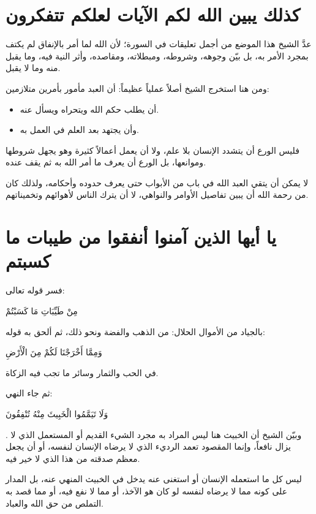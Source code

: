 \separator

\section{كذلك يبين الله لكم الآيات لعلكم تتفكرون}
عدَّ الشيخ هذا الموضع من أجمل تعليقات  في السورة؛ لأن الله لما أمر بالإنفاق لم يكتف بمجرد الأمر به، بل بيّن وجوهه، وشروطه، ومبطلاته، ومقاصده، وأثر النية فيه، وما يقبل منه وما لا يقبل.

ومن هنا استخرج الشيخ أصلاً عملياً عظيماً: أن العبد مأمور بأمرين متلازمين:
\begin{itemize}
    \item أن يطلب حكم الله ويتحراه ويسأل عنه.
    \item وأن يجتهد بعد العلم في العمل به.
\end{itemize}

فليس الورع أن يتشدد الإنسان بلا علم، ولا أن يعمل أعمالاً كثيرة وهو يجهل شروطها وموانعها، بل الورع أن يعرف ما أمر الله به ثم يقف عنده.

\begin{fawaid}
لا يمكن أن يتقي العبد الله في باب من الأبواب حتى يعرف حدوده وأحكامه، ولذلك كان من رحمة الله أن يبين تفاصيل الأوامر والنواهي، لا أن يترك الناس لأهوائهم وتخميناتهم.
\end{fawaid}

\section{يا أيها الذين آمنوا أنفقوا من طيبات ما كسبتم}
فسر  قوله تعالى: \begin{ayah}مِنْ طَيِّبَاتِ مَا كَسَبْتُمْ\end{ayah} بالجياد من الأموال الحلال: من الذهب والفضة ونحو ذلك، ثم ألحق به قوله: \begin{ayah}وَمِمَّا أَخْرَجْنَا لَكُمْ مِنَ الْأَرْضِ\end{ayah} في الحب والثمار وسائر ما تجب فيه الزكاة.

ثم جاء النهي: \begin{ayah}وَلَا تَيَمَّمُوا الْخَبِيثَ مِنْهُ تُنْفِقُونَ\end{ayah}. وبيّن الشيخ أن الخبيث هنا ليس المراد به مجرد الشيء القديم أو المستعمل الذي لا يزال نافعاً، وإنما المقصود تعمد الرديء الذي لا يرضاه الإنسان لنفسه، أو أن يجعل معظم صدقته من هذا الذي لا خير فيه.

\begin{fawaid}
ليس كل ما استعمله الإنسان أو استغنى عنه يدخل في الخبيث المنهي عنه، بل المدار على كونه مما لا يرضاه لنفسه لو كان هو الآخذ، أو مما لا نفع فيه، أو مما قصد به التملص من حق الله والعباد.
\end{fawaid}

